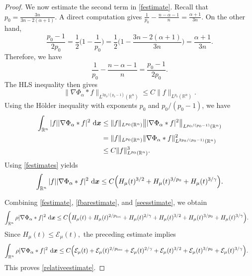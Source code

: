 \documentclass[reqno,11pt]{amsart}
\numberwithin{equation}{section}
\theoremstyle{definition}
\def\dd{{\, \rm d}}
\begin{document}
\begin{proof}
We now estimate the second term in \eqref{festimate}.  Recall that
$p_0=\frac{3n}{3n-2(\alpha+1)}.$
A direct computation gives
$
  \frac1{p_0}-\frac{n-\alpha-1}{n}=\frac{\alpha+1}{3n}.$
On the other hand,
\[
 \frac{p_0-1}{2p_0} =
 \frac12\Big(1-\frac1{p_0}\Big)
 = \frac12\Big( 1-\frac{3n-2(\alpha+1)}{3n}  \Big)  
 =  \frac{\alpha+1}{3n}.
\]
Therefore, we have
\[  \frac1{p_0}-\frac{n-\alpha-1}{n}  =
  \frac{p_0-1}{2p_0}.
\]
The HLS inequality then gives
\begin{equation*} 
\|\nabla\Phi_\alpha*f\|_{L^{2p_0/(p_0-1)}(\mathbb R^n)}
  \le   C\|f\|_{L^{p_0}(\mathbb R^n)}.
\end{equation*}
Using the H\"older inequality with exponents $p_0$ and $p_0/(p_0-1)$,
we have
\[
\begin{aligned}
  \int_{\mathbb R^n}|f||\nabla\Phi_\alpha*f|^2\,\dd\boldsymbol{x}
  &\le
 \|f\|_{L^{p_0}(\mathbb R^n)} \big\||\nabla\Phi_\alpha*f|^2
 \big\|_{L^{p_0/(p_0-1)}(\mathbb R^n)}                      \\
  &= \|f\|_{L^{p_0}(\mathbb R^n)}
 \|\nabla\Phi_\alpha*f\|_{L^{2p_0/(p_0-1)}(\mathbb R^n)}^2   \\
 &\le  C\|f\|_{L^{p_0}(\mathbb R^n)}^3 .
\end{aligned}
\]
Using \eqref{festimates} yields
\begin{equation}\label{seesstimate}
\int_{\mathbb R^n}|f||\nabla\Phi_\alpha*f|^2\,\dd\boldsymbol{x}
  \le C\Big( H_\mu(t)^{3/2} +  H_\mu(t)^{3/p_0}  +   H_\mu(t)^{3/\gamma} \Big).
\end{equation}

Combining \eqref{festimate},
\eqref{fbarestimate}, and
\eqref{seesstimate}, we obtain
\[
\begin{aligned}
 \int_{\mathbb R^n}\rho|\nabla\Phi_\alpha*f|^2\,\dd\boldsymbol{x}  &\le
 C\Big(H_\mu(t)+ H_\mu(t)^{2/p_{\rm loc}}
  +   H_\mu(t)^{2/\gamma}  +  H_\mu(t)^{3/2}  +  H_\mu(t)^{3/p_0}
  +   H_\mu(t)^{3/\gamma}  \Big).
\end{aligned}
\]
Since $H_\mu(t)\le \mathcal E_\mu(t),$
the preceding estimate implies
\[
\begin{aligned}
\int_{\mathbb R^n}\rho|\nabla\Phi_\alpha*f|^2\,\dd\boldsymbol{x}
&\le C\Big( \mathcal E_\mu(t) + \mathcal E_\mu(t)^{2/p_{\rm loc}}
  + \mathcal E_\mu(t)^{2/\gamma} +
  \mathcal E_\mu(t)^{3/2}  +
 \mathcal E_\mu(t)^{3/p_0} +
 \mathcal E_\mu(t)^{3/\gamma} \Big).
\end{aligned}
\]
This proves \eqref{relativeestimate}.
\end{proof}
\end{document}
